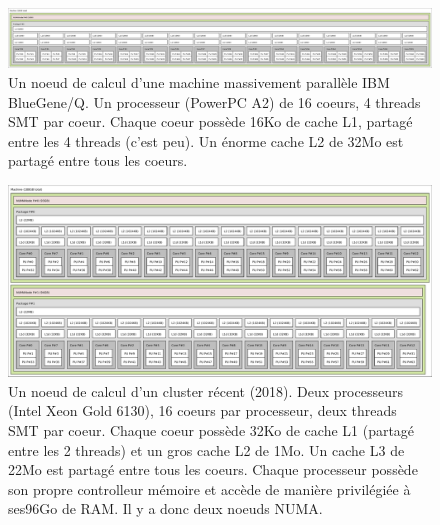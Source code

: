 \begin{figure}
  \includegraphics[width=\textwidth]{lstopo_bgq.png}
  \caption{Un noeud de calcul d'une machine massivement parallèle IBM
    BlueGene/Q. Un processeur (PowerPC A2) de 16 coeurs, 4 threads SMT par
    coeur. Chaque coeur possède 16Ko de cache L1, partagé entre les 4 threads
    (c'est peu). Un énorme cache L2 de 32Mo est partagé entre tous les
    coeurs.\label{fig:arch4}}
\end{figure}



\begin{figure}
  \centering
  \includegraphics[width=\textwidth]{lstopo_gr20.pdf}
  \caption{Un noeud de calcul d'un cluster récent (2018). Deux processeurs
    (Intel Xeon Gold 6130), 16 coeurs par processeur, deux threads SMT par
    coeur. Chaque coeur possède 32Ko de cache L1 (partagé entre les 2 threads)
    et un gros cache L2 de 1Mo. Un cache L3 de 22Mo est partagé entre tous les
    coeurs. Chaque processeur possède son propre controlleur mémoire et accède
    de manière privilégiée à \og ses\fg 96Go de RAM. Il y a donc deux noeuds
    NUMA.\label{fig:arch2}}
\end{figure}

